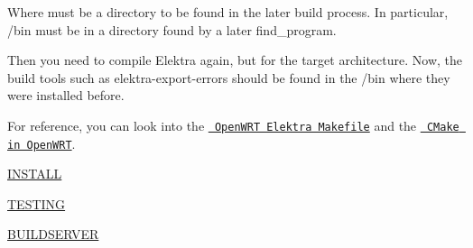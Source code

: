 \begin{DoxyCode}{0}
\end{DoxyCode}


Where {\ttfamily } must be a directory to be found in the later build process. In particular, {\ttfamily /bin} must be in a directory found by a later {\ttfamily find\+\_\+program}.

Then you need to compile Elektra again, but for the target architecture. Now, the build tools such as {\ttfamily elektra-\/export-\/errors} should be found in the {\ttfamily /bin} where they were installed before.

For reference, you can look into the \href{https://github.com/openwrt/packages/blob/master/libs/elektra/Makefile}{\texttt{ Open\+W\+RT Elektra Makefile}} and the \href{https://github.com/openwrt/openwrt/blob/master/include/cmake.mk}{\texttt{ C\+Make in Open\+W\+RT}}.


\begin{DoxyItemize}
\item \mbox{\hyperlink{doc_INSTALL_md}{I\+N\+S\+T\+A\+LL}}
\item \mbox{\hyperlink{doc_TESTING_md}{T\+E\+S\+T\+I\+NG}}
\item \mbox{\hyperlink{doc_BUILDSERVER_md}{B\+U\+I\+L\+D\+S\+E\+R\+V\+ER}} 
\end{DoxyItemize}